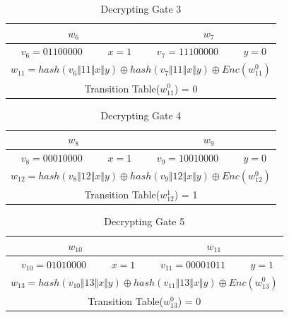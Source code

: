 \documentclass[times]{article}
\begin{document}
	\begin{table}
		\centering
		\caption{Decrypting Gate 3}
		\label{tab:DG3}
		\begin{tabular}{|c|c||c|c|}
			\hline
			\multicolumn{2}{|c||}{$w_6$} & \multicolumn{2}{|c|}{$w_7$} \\
			\hline
			$v_6 = 01100000$ & $x = 1$ & $v_7 = 11100000$ & $y = 0$ \\
			\hline
			\multicolumn{4}{|c||}{$w_{11} = hash(v_6 \Vert 11 \Vert x \Vert y) \oplus hash(v_7 \Vert 11 \Vert x \Vert y) \oplus Enc(w_{11}^0)$} \\
			\hline
			\multicolumn{4}{|c||}{Transition Table($w_{11}^0$) = 0} \\
			\hline
		\end{tabular}
	\end{table}

	\begin{table}
		\centering
		\caption{Decrypting Gate 4}
		\label{tab:DG4}
		\begin{tabular}{|c|c||c|c|}
			\hline
			\multicolumn{2}{|c||}{$w_8$} & \multicolumn{2}{|c|}{$w_9$} \\
			\hline
			$v_8 = 00010000$ & $x = 1$ & $v_9 = 10010000$ & $y = 0$ \\
			\hline
			\multicolumn{4}{|c||}{$w_{12} = hash(v_8 \Vert 12 \Vert x \Vert y) \oplus hash(v_9 \Vert 12 \Vert x \Vert y) \oplus Enc(w_{12}^0)$} \\
			\hline
			\multicolumn{4}{|c||}{Transition Table($w_{12}^1$) = 1} \\
			\hline
		\end{tabular}
	\end{table}

	\begin{table}
		\centering
		\caption{Decrypting Gate 5}
		\label{tab:DG5}
		\begin{tabular}{|c|c||c|c|}
			\hline
			\multicolumn{2}{|c||}{$w_{10}$} & \multicolumn{2}{|c|}{$w_{11}$} \\
			\hline
			$v_{10} = 01010000$ & $x = 1$ & $v_{11} = 00001011$ & $y = 1$ \\
			\hline
			\multicolumn{4}{|c||}{$w_{13} = hash(v_{10} \Vert 13 \Vert x \Vert y) \oplus hash(v_{11} \Vert 13 \Vert x \Vert y) \oplus Enc(w_{13}^0)$} \\
			\hline
			\multicolumn{4}{|c||}{Transition Table($w_{13}^0$) = 0} \\
			\hline
		\end{tabular}
	\end{table}
\end{document}

